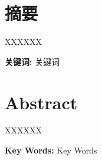 \chapter*{摘\hspace{1.75\ccwd}要}

XXXXXX

\vspace{1.25\ccwd}\noindent\textbf{关键词:} 关键词

\chapter*{\textbf{Abstract}}

XXXXXX

\vspace{1.25\ccwd}\noindent\textbf{Key Words:} Key Words
